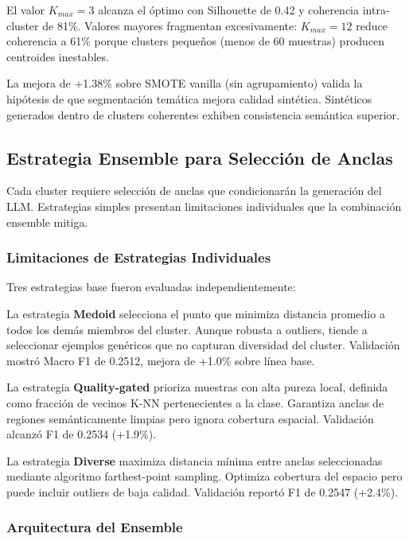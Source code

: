 El valor $K_{max}=3$ alcanza el óptimo con Silhouette de 0.42 y coherencia intra-cluster de 81\%. Valores mayores fragmentan excesivamente: $K_{max}=12$ reduce coherencia a 61\% porque clusters pequeños (menos de 60 muestras) producen centroides inestables.

La mejora de +1.38\% sobre SMOTE vanilla (sin agrupamiento) valida la hipótesis de que segmentación temática mejora calidad sintética. Sintéticos generados dentro de clusters coherentes exhiben consistencia semántica superior.

\subsection{Estrategia Ensemble para Selección de Anclas}
\label{subsec:ensemble_anchors}

Cada cluster requiere selección de anclas que condicionarán la generación del LLM. Estrategias simples presentan limitaciones individuales que la combinación ensemble mitiga.

\subsubsection*{Limitaciones de Estrategias Individuales}

Tres estrategias base fueron evaluadas independientemente:

La estrategia \textbf{Medoid} selecciona el punto que minimiza distancia promedio a todos los demás miembros del cluster. Aunque robusta a outliers, tiende a seleccionar ejemplos genéricos que no capturan diversidad del cluster. Validación mostró Macro F1 de 0.2512, mejora de +1.0\% sobre línea base.

La estrategia \textbf{Quality-gated} prioriza muestras con alta pureza local, definida como fracción de vecinos K-NN pertenecientes a la clase. Garantiza anclas de regiones semánticamente limpias pero ignora cobertura espacial. Validación alcanzó F1 de 0.2534 (+1.9\%).

La estrategia \textbf{Diverse} maximiza distancia mínima entre anclas seleccionadas mediante algoritmo farthest-point sampling. Optimiza cobertura del espacio pero puede incluir outliers de baja calidad. Validación reportó F1 de 0.2547 (+2.4\%).

\subsubsection*{Arquitectura del Ensemble}

